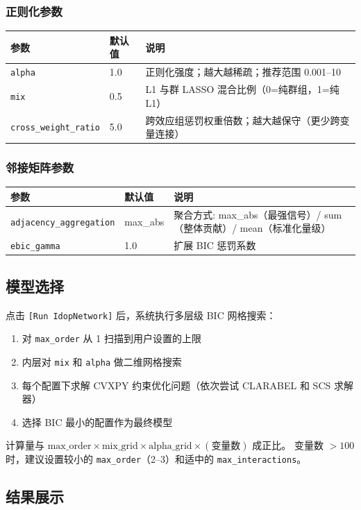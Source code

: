 \documentclass[12pt,a4paper]{ctexart}
\makeatletter
\newcommand{\btn}[1]{\texttt{[#1]}}
\newcommand{\param}[1]{\texttt{#1}}
\newcommand{\paramtable}[1]{%
    \begin{center}
    \small
    \begin{tabular}{@{}llp{5.5cm}@{}}
    \toprule
    \textbf{参数} & \textbf{默认值} & \textbf{说明} \\
    \midrule
    #1
    \bottomrule
    \end{tabular}
    \end{center}
}
\makeatother
\begin{document}
\subsubsection{正则化参数}

\paramtable{
    \param{alpha} & 1.0 & 正则化强度；越大越稀疏；推荐范围 0.001--10\\
    \param{mix} & 0.5 & L1 与群 LASSO 混合比例（0=纯群组，1=纯 L1）\\
    \param{cross\_weight\_ratio} & 5.0 & 跨效应组惩罚权重倍数；越大越保守（更少跨变量连接）\\
}

\subsubsection{邻接矩阵参数}

\paramtable{
    \param{adjacency\_aggregation} & max\_abs & 聚合方式: max\_abs（最强信号）/ sum（整体贡献）/ mean（标准化量级）\\
    \param{ebic\_gamma} & 1.0 & 扩展 BIC 惩罚系数\\
}

\subsection{模型选择}

点击 \btn{Run IdopNetwork} 后，系统执行多层级 BIC 网格搜索：

\begin{enumerate}[leftmargin=*]
    \item 对 \param{max\_order} 从 1 扫描到用户设置的上限
    \item 内层对 \param{mix} 和 \param{alpha} 做二维网格搜索
    \item 每个配置下求解 CVXPY 约束优化问题（依次尝试 CLARABEL 和 SCS 求解器）
    \item 选择 BIC 最小的配置作为最终模型
\end{enumerate}

\begin{infobox}[计算时间提示]
    计算量与 $\text{max\_order} \times \text{mix\_grid} \times \text{alpha\_grid} \times (\text{变量数})$ 成正比。
    变量数 $> 100$ 时，建议设置较小的 \param{max\_order}（2--3）和适中的 \param{max\_interactions}。
\end{infobox}

\subsection{结果展示}
\end{document}
